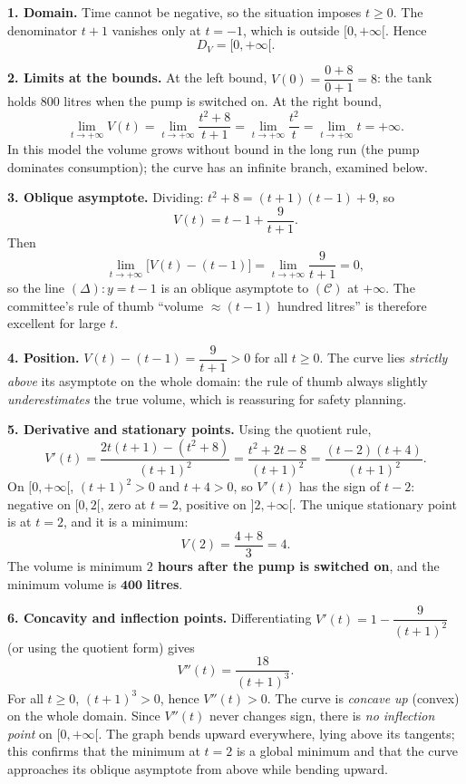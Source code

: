 \documentclass[11pt]{article}
\newcommand{\cle}[1]{{\popxbold\color{popdark}#1}}
\newcounter{popsec}
\newcounter{popsub}
\newcommand{\courssub}[1]{%
  \stepcounter{popsub}%
  \par\vspace{9pt}\noindent{\popxbold\fontsize{11.5}{13}\selectfont\color{popink}{\color{poporange}\thepopsec.\thepopsub}\hspace{6pt}#1}\par\nopagebreak\vspace{4pt}
}
\begin{document}
\courssub{Model answer}

\textbf{1. Domain.} Time cannot be negative, so the situation imposes $t \geq 0$. The denominator $t + 1$ vanishes only at $t = -1$, which is outside $[0, +\infty[$. Hence
\[ D_V = [0, +\infty[. \]

\textbf{2. Limits at the bounds.} At the left bound, $V(0) = \dfrac{0 + 8}{0 + 1} = 8$: the tank holds $800$ litres when the pump is switched on. At the right bound,
\[ \lim_{t \to +\infty} V(t) = \lim_{t \to +\infty} \frac{t^{2}+8}{t+1} = \lim_{t \to +\infty} \frac{t^{2}}{t} = \lim_{t \to +\infty} t = +\infty. \]
In this model the volume grows without bound in the long run (the pump dominates consumption); the curve has an infinite branch, examined below.

\textbf{3. Oblique asymptote.} Dividing: $t^{2} + 8 = (t+1)(t-1) + 9$, so
\[ V(t) = t - 1 + \frac{9}{t+1}. \]
Then
\[ \lim_{t \to +\infty} \bigl[ V(t) - (t - 1) \bigr] = \lim_{t \to +\infty} \frac{9}{t+1} = 0, \]
so the line $(\Delta): y = t - 1$ is an \cle{oblique asymptote} to $(\mathcal{C})$ at $+\infty$. The committee's rule of thumb ``volume $\approx (t-1)$ hundred litres'' is therefore excellent for large $t$.

\textbf{4. Position.} $V(t) - (t-1) = \dfrac{9}{t+1} > 0$ for all $t \geq 0$. The curve lies \emph{strictly above} its asymptote on the whole domain: the rule of thumb always slightly \emph{underestimates} the true volume, which is reassuring for safety planning.

\textbf{5. Derivative and stationary points.} Using the quotient rule,
\[ V'(t) = \frac{2t(t+1) - (t^{2}+8)}{(t+1)^{2}} = \frac{t^{2} + 2t - 8}{(t+1)^{2}} = \frac{(t-2)(t+4)}{(t+1)^{2}}. \]
On $[0, +\infty[$, $(t+1)^{2} > 0$ and $t + 4 > 0$, so $V'(t)$ has the sign of $t - 2$: negative on $[0, 2[$, zero at $t = 2$, positive on $]2, +\infty[$. The unique stationary point is at $t = 2$, and it is a \cle{minimum}:
\[ V(2) = \frac{4 + 8}{3} = 4. \]
The volume is minimum \textbf{$2$ hours after the pump is switched on}, and the minimum volume is $\mathbf{400}$ \textbf{litres}.

\textbf{6. Concavity and inflection points.} Differentiating $V'(t) = 1 - \dfrac{9}{(t+1)^2}$ (or using the quotient form) gives
\[ V''(t) = \frac{18}{(t+1)^3}. \]
For all $t \geq 0$, $(t+1)^3 > 0$, hence $V''(t) > 0$. The curve is \emph{concave up} (convex) on the whole domain. Since $V''(t)$ never changes sign, there is \emph{no inflection point} on $[0, +\infty[$. The graph bends upward everywhere, lying above its tangents; this confirms that the minimum at $t=2$ is a global minimum and that the curve approaches its oblique asymptote from above while bending upward.
\end{document}
